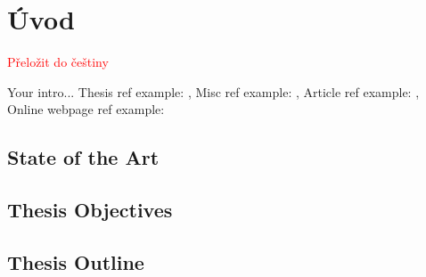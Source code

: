 \chapter{Úvod} \label{chap:introduction}

\textcolor{red}{Přeložit do češtiny}

Your intro... Thesis ref example: \cite{bulin:2016}, Misc ref example: \cite{smidl:pc}, Article ref example: \cite{mcculloch:neuron}, Online webpage ref example: \cite{online:xor_solution}

\section{State of the Art} \label{sec:state_of_the_art}

\section{Thesis Objectives} \label{sec:thesis_objectives}

\section{Thesis Outline} \label{sec:thesis_outline}
